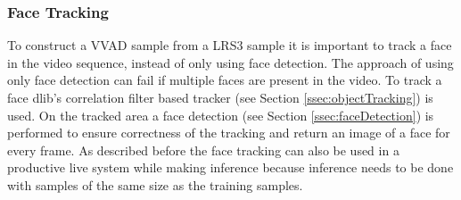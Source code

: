 \subsubsection{Face Tracking}
To construct a VVAD sample from a LRS3 sample it is important to track a face in the video sequence, instead of only using face detection.
The approach of using only face detection can fail if multiple faces are present in the video.
To track a face dlib's correlation filter based tracker (see Section \ref{ssec:objectTracking}) is used.
On the tracked area a face detection (see Section \ref{ssec:faceDetection}) is performed to ensure correctness of the tracking and return an image of a face for every frame.
As described before the face tracking can also be used in a productive live system while making inference because inference needs to be done with samples of the same size as the training samples.


